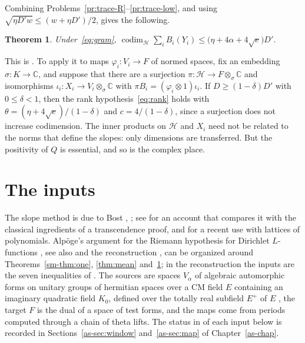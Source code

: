 \documentclass[reqno]{amsart}
\newcounter{chap}
\theoremstyle{definition}
\theoremstyle{plain}
\newtheorem{theorem}{Theorem}[section]
\newcommand{\C}{\mathbb{C}}
\newcommand{\Hc}{\mathcal{H}}
\newcommand{\codim}{\operatorname{codim}}
\begin{document}
Combining Problems~\ref{pr:trace-R}--\ref{pr:trace-low}, and using \(\sqrt{\eta D' w} \le (w + \eta D')/2\), gives the following.

\begin{theorem}\label{thm:rank}
Under~\eqref{eq:gram}, \(\codim_\Hc \sum_i B_i(Y_i) \le \bigl(\eta + 4\alpha + 4\sqrt e\bigr) D'\).
\end{theorem}

This is \cite[Lemma~4.2]{Zh}.  To apply it to maps \(\varphi_i \colon V_i \to F\) of normed spaces, fix an embedding \(\sigma \colon K \to \C\), and suppose that there are a surjection \(\pi \colon \Hc \to F \otimes_\sigma \C\) and isomorphisms \(\iota_i \colon X_i \to V_i \otimes_\sigma \C\) with \(\pi B_i = (\varphi_i \otimes 1)\iota_i\).  If \(D \ge (1 - \delta) D'\) with \(0 \le \delta < 1\), then the rank hypothesis~\eqref{eq:rank} holds with \(\theta = (\eta + 4\sqrt e)/(1 - \delta)\) and \(c = 4/(1-\delta)\), since a surjection does not increase codimension.  The inner products on \(\Hc\) and \(X_i\) need not be related to the norms that define the slopes: only dimensions are transferred.  But the positivity of \(Q\) is essential, and so is the complex place.


\section{The inputs}\label{sec:inputs}

The slope method is due to Bost \cite{Bo96}, \cite{Bo01}; see \cite[\S\S1.3--1.5]{CL} for an account that compares it with the classical ingredients of a transcendence proof, and \cite[\S2.3]{CDT} for a recent use with lattices of polynomials.  Alpöge's argument for the Riemann hypothesis for Dirichlet \(L\)-functions \cite{Alp}, see also \cite[\S\S3--4]{Zh} and the reconstruction \cite{Adr}, can be organized around Theorems~\ref{sm-thm:one}, \ref{thm:mean} and~\ref{thm:rank}; in the reconstruction the inputs are the seven inequalities of \cite[Prop.~3.1, (3.1)--(3.7)]{Adr}.  The sources are spaces \(V_\alpha\) of algebraic automorphic forms on unitary groups of hermitian spaces over a CM field \(E\) containing an imaginary quadratic field \(K_0\), defined over the totally real subfield \(E^+\) of \(E\) \cite[\S1.3]{Zh}, the target \(F\) is the dual of a space of test forms, and the maps come from periods computed through a chain of theta lifts.  The status in \cite{Adr} of each input below is recorded in Sections~\ref{as-sec:window} and~\ref{as-sec:map} of Chapter~\ref{as-chap}.
\end{document}
